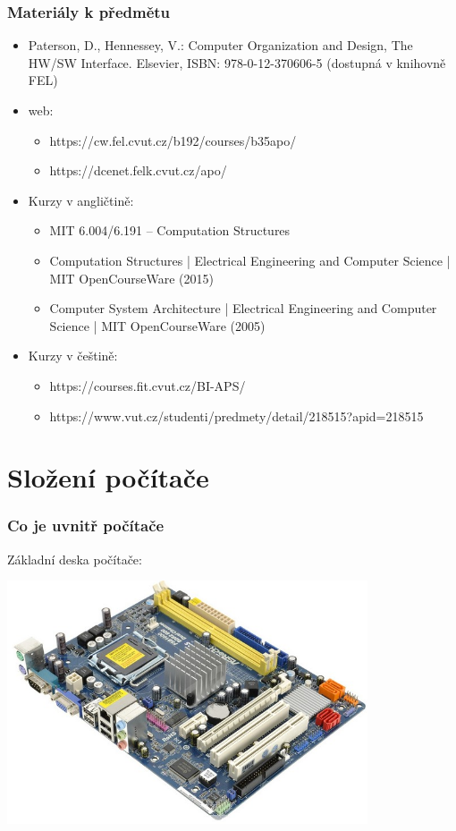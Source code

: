 \documentclass{beamer}
\begin{document}
\begin{frame}
\frametitle{Materiály k předmětu}
\begin{itemize}
\item Paterson, D., Hennessey, V.: Computer Organization and Design, The HW/SW Interface. Elsevier, ISBN: 978-0-12-370606-5 (dostupná v knihovně FEL)
\item web:
\begin{itemize}
\item https://cw.fel.cvut.cz/b192/courses/b35apo/
\item https://dcenet.felk.cvut.cz/apo/
\end{itemize}
\item Kurzy v angličtině:
\begin{itemize}
\item MIT 6.004/6.191 – Computation Structures
\item Computation Structures | Electrical Engineering and Computer Science | MIT OpenCourseWare (2015)
\item Computer System Architecture | Electrical Engineering and Computer Science | MIT OpenCourseWare (2005)
\end{itemize}
\item Kurzy v češtině:
\begin{itemize}
\item https://courses.fit.cvut.cz/BI-APS/
\item https://www.vut.cz/studenti/predmety/detail/218515?apid=218515
\end{itemize}

\end{itemize}
\end{frame}

\section{Složení počítače}
\begin{frame}
\frametitle{Co je uvnitř počítače}

Základní deska počítače:
\begin{center}
   \includegraphics[width=0.8\textwidth]{fig/motherboard.jpg}
\end{center}

\end{frame}
\end{document}
